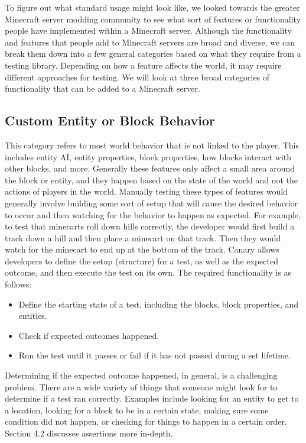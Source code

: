 \documentclass{article}
\begin{document}
\begin{onehalfspacing}
To figure out what standard usage might look like, we looked towards the
greater Minecraft server modding community to see what sort of features
or functionality people have implemented within a Minecraft server.
Although the functionality and features that people add to Minecraft
servers are broad and diverse, we can break them down into a few general
categories based on what they require from a testing library. Depending
on how a feature affects the world, it may require different approaches
for testing. We will look at three broad categories of functionality
that can be added to a Minecraft server.

\subsection{Custom Entity or Block Behavior}

This category refers to most world behavior that is not linked to the
player. This includes entity AI, entity properties, block properties,
how blocks interact with other blocks, and more. Generally these
features only affect a small area around the block or entity, and they
happen based on the state of the world and not the actions of players in
the world. Manually testing these types of features would generally
involve building some sort of setup that will cause the desired behavior
to occur and then watching for the behavior to happen as expected. For
example, to test that minecarts roll down hills correctly, the developer
would first build a track down a hill and then place a minecart on that
track. Then they would watch for the minecart to end up at the bottom of
the track. Canary allows developers to define the setup (structure) for
a test, as well as the expected outcome, and then execute the test on
its own. The required functionality is as follows:

\begin{itemize}
\item
  Define the starting state of a test, including the blocks, block
  properties, and entities.
\item
  Check if expected outcomes happened.
\item
  Run the test until it passes or fail if it has not passed during a set
  lifetime.
\end{itemize}

Determining if the expected outcome happened, in general, is a
challenging problem. There are a wide variety of things that someone
might look for to determine if a test ran correctly. Examples include
looking for an entity to get to a location, looking for a block to be in
a certain state, making sure some condition did not happen, or checking
for things to happen in a certain order. Section 4.2 discusses
assertions more in-depth.


\end{onehalfspacing}
\end{document}
